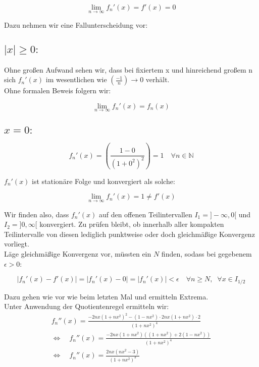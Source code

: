 \documentclass[a4paper,german,12pt,smallheadings]{scrartcl}
\begin{document}
\begin{equation*}
\lim\limits_{n \to \infty}f_n'(x)=f'(x)=0
\end{equation*}

Dazu nehmen wir eine Fallunterscheidung vor:

\subsection*{$|x|\ge0:$}
Ohne großen Aufwand sehen wir, dass bei fixiertem x und hinreichend großem n sich $f_n'(x)$ im wesentlichen wie $\left(\frac{-1}{n}\right)\rightarrow 0$ verhält.\\
Ohne formalen Beweis folgern wir:

\begin{equation*}
\lim\limits_{n \to \infty}f_n'(x)=f_n(x)
\end{equation*}

\subsection*{$x=0:$}
\begin{equation*}
f_n'(x)=\left(\frac{1-0}{\left(1+0^2\right)^2}\right)=1 \quad \forall n\in\mathbb{N}
\end{equation*}

$f_n'(x)$ ist stationäre Folge und konvergiert als solche:

\begin{equation*}
\lim\limits_{n \to \infty} f_n'(x)=1 \neq f'(x)
\end{equation*}

Wir finden also, dass $f_n'(x)$ auf den offenen Teilintervallen $I_1=]-\infty,0[$ und $I_2=]0,\infty[$ konvergiert. Zu prüfen bleibt, ob innerhalb aller kompakten Teilintervalle von diesen lediglich punktweise oder doch gleichmäßige Konvergenz vorliegt.\\
Läge gleichmäßige Konvergenz vor, müssten ein $N$ finden, sodass bei gegebenem $\epsilon>0$:

\begin{equation*}
|f_n'(x)-f'(x)|=|f_n'(x)-0|=|f_n'(x)|<\epsilon \quad \forall n\ge N, \;\; \forall x\in I_{1/2}
\end{equation*}

Dazu gehen wie vor wie beim letzten Mal und ermitteln Extrema.\\
Unter Anwendung der Quotientenregel ermitteln wir:
\begin{align*}
f_n''(x)=\frac{-2nx\left(1+nx^2\right)^2-\left(1-nx^2\right)\cdot 2nx\left(1+nx^2\right)\cdot 2}{\left(1+nx^2\right)^4}\\
\Leftrightarrow \quad f_n''(x)=\frac{-2nx\left(1+nx^2\right)\left(\left(1+nx^2\right)+2\left(1-nx^2\right)\right)}{\left(1+nx^2\right)^4}\\
\Leftrightarrow \quad f_n''(x)=\frac{2nx\left(nx^2-3\right)}{\left(1+nx^2\right)^3}
\end{align*}
\end{document}
